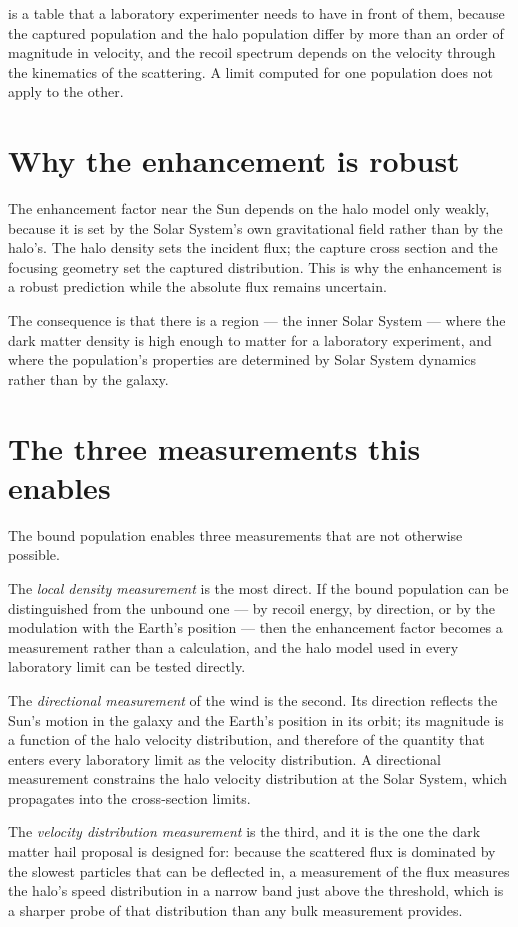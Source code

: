  is a table that a laboratory experimenter needs to
have in front of them, because the captured population and the halo
population differ by more than an order of magnitude in velocity, and the
recoil spectrum depends on the velocity through the kinematics of the
scattering. A limit computed for one population does not apply to the other.

\section{Why the enhancement is robust}The enhancement factor near the Sun depends
on the halo model only weakly, because it is set by the Solar System's own
gravitational field rather than by the halo's. The halo density sets the
incident flux; the capture cross section and the focusing geometry set the
captured distribution. This is why the enhancement is a robust prediction
while the absolute flux remains uncertain.

The consequence is that there is a region --- the inner Solar System --- where
the dark matter density is high enough to matter for a laboratory experiment,
and where the population's properties are determined by Solar System
dynamics rather than by the galaxy.

\section{The three measurements this enables}The bound population enables three
measurements that are not otherwise possible.

The \emph{local density measurement} is the most direct. If the bound
population can be distinguished from the unbound one --- by recoil energy, by
direction, or by the modulation with the Earth's position --- then the
enhancement factor becomes a measurement rather than a calculation, and the
halo model used in every laboratory limit can be tested directly.

The \emph{directional measurement} of the wind is the second. Its direction
reflects the Sun's motion in the galaxy and the Earth's position in its
orbit; its magnitude is a function of the halo velocity distribution, and
therefore of the quantity that enters every laboratory limit as the velocity
distribution. A directional measurement constrains the halo velocity
distribution at the Solar System, which propagates into the cross-section
limits.

The \emph{velocity distribution measurement} is the third, and it is the one
the dark matter hail proposal is designed for: because the scattered flux is
dominated by the slowest particles that can be deflected in, a measurement of
the flux measures the halo's speed distribution in a narrow band just above
the threshold, which is a sharper probe of that distribution than any bulk
measurement provides.

